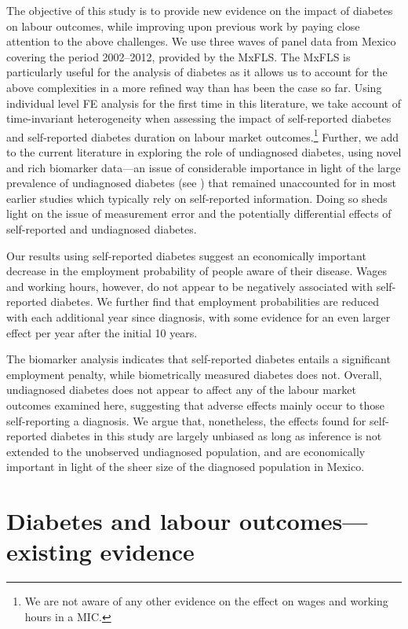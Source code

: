 The objective of this study is to provide new evidence on the impact of diabetes on labour outcomes, while improving upon previous work by paying close attention to the above challenges. We use three waves of panel data from Mexico covering the period 2002--2012, provided by the \ac{MxFLS}. The \ac{MxFLS} is particularly useful for the analysis of diabetes as it allows us to account for the above complexities in a more refined way than has been the case so far. Using individual level \ac{FE} analysis for the first time in this literature, we take account of time-invariant heterogeneity when assessing the impact of self-reported diabetes and self-reported diabetes duration on labour market outcomes.\footnote{We are not aware of any other evidence on the effect on wages and working hours in a \ac{MIC}.} Further, we add to the current literature in exploring the role of undiagnosed diabetes, using novel and rich biomarker data---an issue of considerable importance in light of the large prevalence of undiagnosed diabetes (see \textcite{Beagley2014}) that remained unaccounted for in most earlier studies which typically rely on self-reported information. Doing so sheds light on the issue of measurement error and the potentially differential effects of self-reported and undiagnosed diabetes. 

Our results using self-reported diabetes suggest an economically important decrease in the employment probability of people aware of their disease. Wages and working hours, however, do not appear to be negatively associated with self-reported diabetes. We further find that employment probabilities are reduced with each additional year since diagnosis, with some evidence for an even larger effect per year after the initial 10 years. 

The biomarker analysis indicates that self-reported diabetes entails a significant employment penalty, while biometrically measured diabetes does not. Overall, undiagnosed diabetes does not appear to affect any of the labour market outcomes examined here, suggesting that adverse effects mainly occur to those self-reporting a diagnosis. We argue that, nonetheless, the effects found for self-reported diabetes in this study are largely unbiased as long as inference is not extended to the unobserved undiagnosed population, and are economically important in light of the sheer size of the diagnosed population in Mexico.


\section{\label{sec:Labor  outcomes and diabetes literature}Diabetes and labour outcomes---existing evidence}

